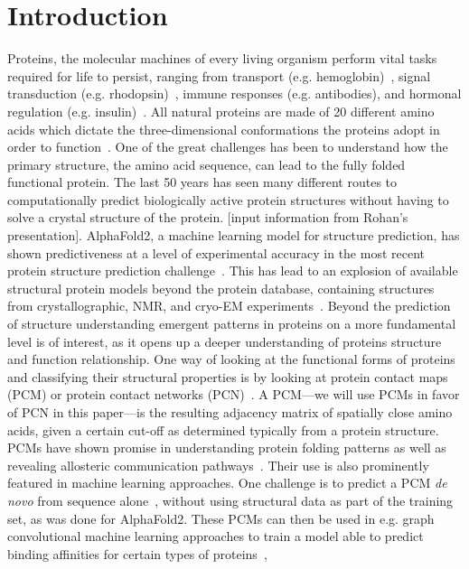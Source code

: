 \documentclass[
reprint,
twocolumn,
amsmath,amssymb,superscriptaddress,aps,
pre]{revtex4-1}
\begin{document}
\section{Introduction}
Proteins, the molecular machines of every living organism perform vital tasks required for life to persist, ranging from transport (e.g. hemoglobin)~\cite{ahmed2020hemoglobin}, signal transduction (e.g. rhodopsin)~\cite{nagata2021rhodopsins}, immune responses (e.g. antibodies), and hormonal regulation (e.g. insulin)~\cite{dill2008protein,Dill1042}. All natural proteins are made of 20 different amino acids which dictate the three-dimensional conformations the proteins adopt in order to function~\cite{scheraga2007protein}. One of the great challenges has been to understand how the primary structure, the amino acid sequence, can lead to the fully folded functional protein. The last 50 years has seen many different routes to computationally predict biologically active protein structures without having to solve a crystal structure of the protein. [input information from Rohan's presentation]. AlphaFold2, a machine learning model for structure prediction, has shown predictiveness at a level of experimental accuracy in the most recent protein structure prediction challenge~\cite{jumper2021highly, kryshtafovych2021critical}. This has lead to an explosion of available structural protein models beyond the protein database, containing structures from crystallographic, NMR, and cryo-EM experiments~\cite{berman2000protein}. Beyond the prediction of structure understanding emergent patterns in proteins on a more fundamental level is of interest, as it opens up a deeper understanding of proteins structure and function relationship.  One way of looking at the functional forms of proteins and classifying their structural properties is by looking at protein contact maps (PCM) or protein contact networks (PCN)~\cite{Vendruscolo2002,DiPaola2013,Estrada2011}. A PCM---we will use PCMs in favor of PCN in this paper---is the resulting adjacency matrix of spatially close amino acids, given a certain cut-off as determined typically from a protein structure. PCMs have shown promise in understanding protein folding patterns as well as revealing allosteric communication pathways~\cite{yao2019establishing, menichetti2016network,dokholyan2002topological}. Their use is also prominently featured in machine learning approaches. One challenge is to predict a PCM \textit{de novo} from sequence alone~\cite{bassot2019using, rives2021biological, rao2021msa}, without using structural data as part of the training set, as was done for AlphaFold2. These PCMs can then be used in e.g. graph convolutional machine learning approaches to train a model able to predict binding affinities for certain types of proteins~\cite{jiang2020drug},
\end{document}
